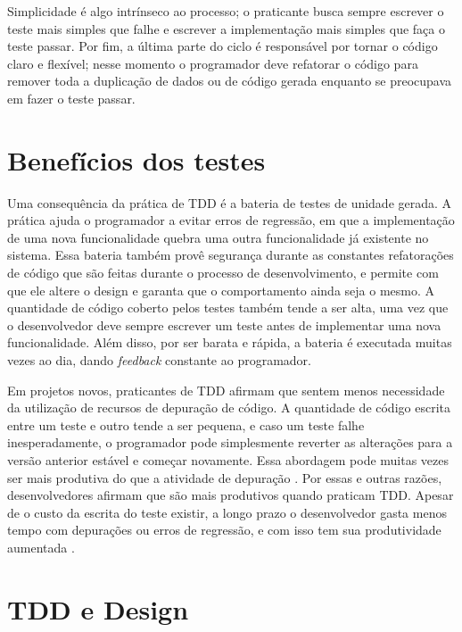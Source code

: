 Simplicidade é algo intrínseco ao processo; o praticante
busca sempre escrever o teste mais simples que falhe e escrever a implementação mais simples
que faça o teste passar. Por fim, a última parte do ciclo é responsável por
tornar o código claro e flexível; nesse momento o programador deve
refatorar o código para remover toda a duplicação de dados ou de código gerada enquanto 
se preocupava em fazer o teste passar.

\section{Benefícios dos testes}

Uma consequência da prática de TDD é a bateria de testes de unidade gerada.
A prática ajuda o programador a evitar erros de regressão, em que a implementação de
uma nova funcionalidade quebra uma outra funcionalidade já existente no sistema.
Essa bateria também provê segurança durante as
constantes refatorações de código que são feitas durante o processo de
desenvolvimento, e permite com que ele altere o design e garanta que o
comportamento ainda seja o mesmo. 
A quantidade de código coberto pelos testes também tende a ser alta, uma vez que o
desenvolvedor deve sempre escrever um teste antes de implementar uma nova
funcionalidade. Além disso, por ser barata e rápida, a bateria é executada
muitas vezes ao dia, dando \textit{feedback} constante ao programador.

Em projetos novos, praticantes de TDD afirmam que sentem menos necessidade da
utilização de recursos de depuração de código. A quantidade de código
escrita entre um teste e outro tende a ser pequena, e caso um teste falhe
inesperadamente, o programador pode simplesmente reverter as alterações para a 
versão anterior estável e começar novamente. Essa abordagem pode muitas vezes
ser mais produtiva do que a atividade de depuração 
\cite{janzen-arch-improvement}. Por essas e outras razões, desenvolvedores afirmam 
que são mais produtivos quando praticam TDD. Apesar de o custo da escrita do teste
existir, a longo prazo o desenvolvedor gasta menos tempo com depurações ou 
erros de regressão, e com isso tem sua produtividade aumentada
\cite{george-e-williams}.

\section{TDD e Design}
\label{cap:tdd-e-design}

